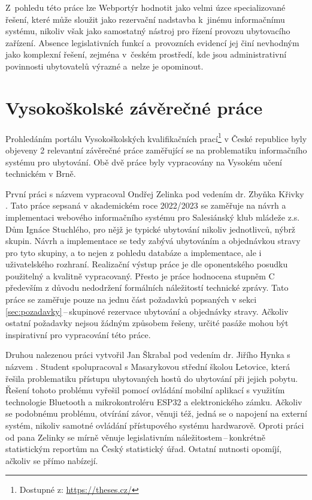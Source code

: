 Z~pohledu této práce lze Webportýr hodnotit jako velmi úzce specializované řešení, které může sloužit jako rezervační nadstavba k~jinému informačnímu systému, nikoliv však jako samostatný nástroj pro řízení provozu ubytovacího zařízení.
Absence legislativních funkcí a~provozních evidencí jej činí nevhodným jako komplexní řešení, zejména v~českém prostředí, kde jsou administrativní povinnosti ubytovatelů výrazné a~nelze je opominout.
\section{Vysokoškolské závěrečné práce}
Prohledáním portálu Vysokoškolských kvalifikačních prací\footnote{Dostupné z: \url{https://theses.cz/}} v České republice byly objeveny 2 relevantní závěrečné práce zaměřující se na problematiku informačního systému pro ubytování.
Obě dvě práce byly vypracovány na Vysokém učení technickém v Brně.

První práci s názvem  vypracoval Ondřej Zelinka pod vedením dr. Zbyňka Křivky \cite{bp-zelinka}.
Tato práce sepsaná v akademickém roce 2022/2023 se zaměřuje na návrh a implementaci webového informačního systému pro  Salesiánský klub mládeže z.s. Dům Ignáce Stuchlého, pro nějž je typické ubytování nikoliv jednotlivců, nýbrž skupin.
Návrh a implementace se tedy zabývá ubytováním a objednávkou stravy pro tyto skupiny, a to nejen z pohledu databáze a implementace, ale i uživatelského rozhraní.
Realizační výstup práce je dle oponentského posudku použitelný a kvalitně vypracovaný.
Přesto je práce hodnocena stupněm C především z důvodu nedodržení formálních náležitostí technické zprávy.
Tato práce se zaměřuje pouze na jednu část požadavků popsaných v sekci \ref{sec:pozadavky}\,--\,skupinové rezervace ubytování a objednávky stravy.
Ačkoliv ostatní požadavky nejsou žádným způsobem řešeny, určité pasáže mohou být inspirativní pro vypracování této práce.

Druhou nalezenou práci vytvořil Jan Škrabal pod vedením dr. Jiřího Hynka s názvem  \cite{bp-skrabal}.
Student spolupracoval s Masarykovou střední školou Letovice, která řešila problematiku přístupu ubytovaných hostů do ubytování při jejich pobytu.
Řešení tohoto problému vyřešil pomocí ovládání mobilní aplikací s využitím technologie Bluetooth a mikrokontroléru ESP32 a elektronického zámku.
Ačkoliv se podobnému problému, otvírání závor, věnuji též, jedná se o napojení na externí systém, nikoliv samotné ovládání přístupového systému hardwarově.
Oproti práci od pana Zelinky se mírně věnuje legislativním náležitostem\,--\,konkrétně statistickým reportům na Český statistický úřad.
Ostatní nutnosti opomíjí, ačkoliv se přímo nabízejí.

